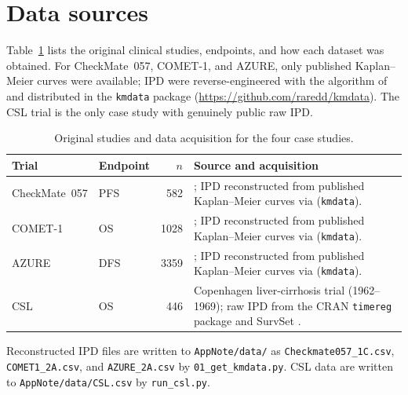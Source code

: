 \documentclass[11pt]{article}
\begin{document}
\section{Data sources}

Table~\ref{tab:data} lists the original clinical studies, endpoints, and
how each dataset was obtained.  For CheckMate~057, COMET-1, and AZURE,
only published Kaplan--Meier curves were available; IPD were
reverse-engineered with the algorithm of \citet{guyot2012} and distributed
in the \texttt{kmdata} package (\url{https://github.com/raredd/kmdata}).
The CSL trial is the only case study with genuinely public raw IPD.

\begin{table}[h]
  \centering
  \caption{Original studies and data acquisition for the four case studies.}
  \label{tab:data}
  \small
  \begin{tabular}{@{}p{2.1cm}p{1.2cm}rp{4.6cm}@{}}
    \toprule
    Trial & Endpoint & $n$ & Source and acquisition \\
    \midrule
    CheckMate~057 &
      PFS & 582 &
      \citet{borghaei2015}; IPD reconstructed from published
      Kaplan--Meier curves via \citet{guyot2012} (\texttt{kmdata}). \\
    COMET-1 &
      OS & 1028 &
      \citet{smith2016}; IPD reconstructed from published
      Kaplan--Meier curves via \citet{guyot2012} (\texttt{kmdata}). \\
    AZURE &
      DFS & 3359 &
      \citet{coleman2011,coleman2014}; IPD reconstructed from published
      Kaplan--Meier curves via \citet{guyot2012} (\texttt{kmdata}). \\
    CSL &
      OS & 446 &
      Copenhagen liver-cirrhosis trial (1962--1969); raw IPD from the CRAN
      \texttt{timereg} package \citep{csl_data} and SurvSet
      \citep{survset2022}. \\
    \bottomrule
  \end{tabular}
\end{table}

\noindent
Reconstructed IPD files are written to \texttt{AppNote/data/} as
\texttt{Checkmate057\_1C.csv}, \texttt{COMET1\_2A.csv}, and
\texttt{AZURE\_2A.csv} by \texttt{01\_get\_kmdata.py}.
CSL data are written to \texttt{AppNote/data/CSL.csv} by
\texttt{run\_csl.py}.

\end{document}
